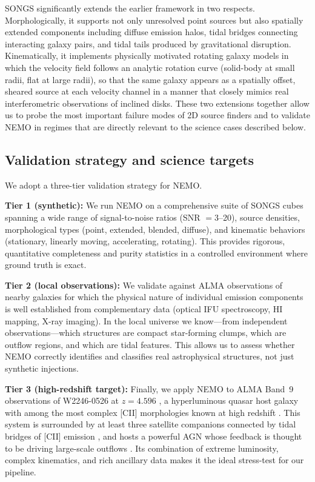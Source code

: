 \documentclass{aa}
\begin{document}
SONGS significantly extends the earlier framework in two respects. Morphologically, it supports not only unresolved point sources but also spatially extended components including diffuse emission halos, tidal bridges connecting interacting galaxy pairs, and tidal tails produced by gravitational disruption. Kinematically, it implements physically motivated rotating galaxy models in which the velocity field follows an analytic rotation curve (solid-body at small radii, flat at large radii), so that the same galaxy appears as a spatially offset, sheared source at each velocity channel in a manner that closely mimics real interferometric observations of inclined disks. These two extensions together allow us to probe the most important failure modes of 2D source finders and to validate NEMO in regimes that are directly relevant to the science cases described below.

\subsection{Validation strategy and science targets}
\label{sec:intro_validation}

We adopt a three-tier validation strategy for NEMO.

\textbf{Tier 1 (synthetic):} We run NEMO on a comprehensive suite of SONGS cubes spanning a wide range of signal-to-noise ratios (SNR $= 3$--20), source densities, morphological types (point, extended, blended, diffuse), and kinematic behaviors (stationary, linearly moving, accelerating, rotating). This provides rigorous, quantitative completeness and purity statistics in a controlled environment where ground truth is exact.

\textbf{Tier 2 (local observations):} We validate against ALMA observations of nearby galaxies for which the physical nature of individual emission components is well established from complementary data (optical IFU spectroscopy, HI mapping, X-ray imaging). In the local universe we know---from independent observations---which structures are compact star-forming clumps, which are outflow regions, and which are tidal features. This allows us to assess whether NEMO correctly identifies and classifies real astrophysical structures, not just synthetic injections.

\textbf{Tier 3 (high-redshift target):} Finally, we apply NEMO to ALMA Band~9 observations of W2246-0526 at $z = 4.596$ \citep{...}, a hyperluminous quasar host galaxy with among the most complex [CII] morphologies known at high redshift \citep{...}. This system is surrounded by at least three satellite companions connected by tidal bridges of [CII] emission \citep{...}, and hosts a powerful AGN whose feedback is thought to be driving large-scale outflows \citep{...}. Its combination of extreme luminosity, complex kinematics, and rich ancillary data makes it the ideal stress-test for our pipeline.
\end{document}
